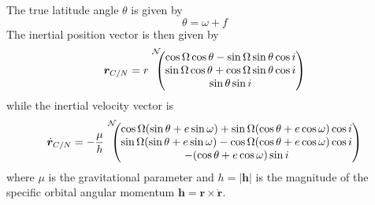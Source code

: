 The true latitude angle $\theta$ is given by
\begin{equation}
	\theta = \omega + f
\end{equation}
The inertial position vector is then given by\cite{schaub}
\begin{equation}
\bm r_{C/N} =r {\begin{matrix} ~ \\ ~ \\ ~
\end{matrix}}^{\cal N}\!\!\!\!  \begin{pmatrix}
\cos\Omega\cos\theta
- \sin\Omega\sin\theta\cos i \\
\sin\Omega\cos\theta + \cos\Omega\sin\theta\cos
i \\
 \sin\theta\sin i
 \end{pmatrix}
\label{eq:tb:r2}
\end{equation}
while the inertial velocity vector is
\begin{equation}
\dot{\bm r}_{C/N} = -\frac{\mu}{h}
{\begin{matrix} ~ \\ ~ \\ ~
\end{matrix}}^{\cal N}\!\!\!\!  \begin{pmatrix}
\cos\Omega (\sin\theta + e\sin\omega ) + \sin\Omega
(\cos\theta+e\cos\omega )\cos i \\
\sin\Omega (\sin\theta + e\sin\omega ) - \cos\Omega ( \cos\theta
+ e\cos\omega )\cos i \\
-(\cos\theta + e\cos\omega )\sin i
\end{pmatrix}
\label{eq:tb:dr2}
\end{equation}
where $\mu$ is the gravitational parameter and $h=|\bm h|$ is the magnitude of the specific orbital angular momentum $\bm h = \bm r \times \dot{\bm r}$.


